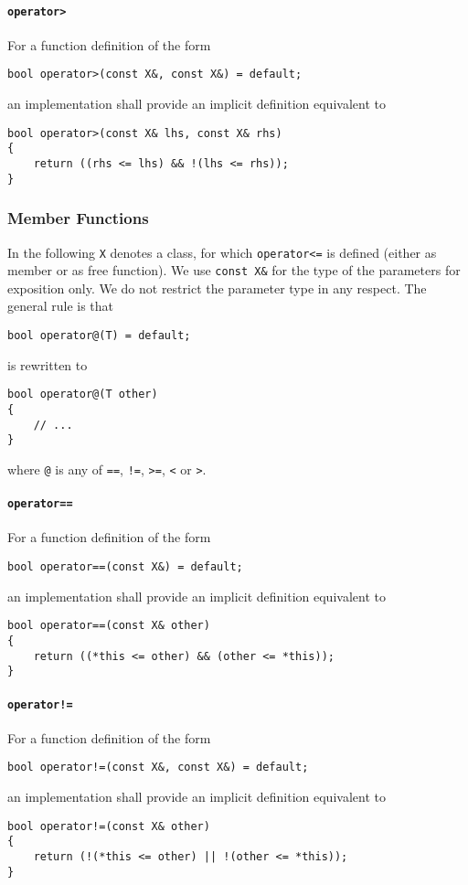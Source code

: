 ﻿\documentclass[a4paper,11pt,final]{article}
\numberwithin{equation}{subsection}
\begin{document}
\paragraph{\texttt{operator>}}
For a function definition of the form
\begin{verbatim}
bool operator>(const X&, const X&) = default;
\end{verbatim}
an implementation shall provide an implicit definition equivalent to
\begin{verbatim}
bool operator>(const X& lhs, const X& rhs)
{
    return ((rhs <= lhs) && !(lhs <= rhs));
}
\end{verbatim}

\subsubsection{Member Functions}
In the following \verb|X| denotes a class, for which \verb|operator<=| is defined (either as member or as free function). We use \verb|const X&| for the type of the parameters for exposition only. We do not restrict the parameter type in any respect. The general rule is that
\begin{verbatim}
bool operator@(T) = default;
\end{verbatim}
is rewritten to
\begin{verbatim}
bool operator@(T other)
{
    // ...
}
\end{verbatim}
where \verb|@| is any of \verb|==|, \verb|!=|, \verb|>=|, \verb|<| or \verb|>|.

\paragraph{\texttt{operator==}}
For a function definition of the form
\begin{verbatim}
bool operator==(const X&) = default;
\end{verbatim}
an implementation shall provide an implicit definition equivalent to
\begin{verbatim}
bool operator==(const X& other)
{
    return ((*this <= other) && (other <= *this));
}
\end{verbatim}

\paragraph{\texttt{operator!=}}
For a function definition of the form
\begin{verbatim}
bool operator!=(const X&, const X&) = default;
\end{verbatim}
an implementation shall provide an implicit definition equivalent to
\begin{verbatim}
bool operator!=(const X& other)
{
    return (!(*this <= other) || !(other <= *this));
}
\end{verbatim}
\end{document}
